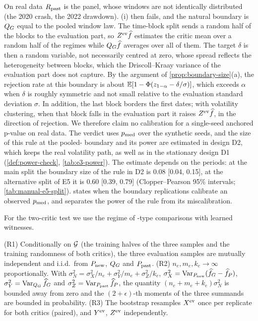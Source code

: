 \begin{remark}\label{rem:nonstat-past}
On real data $R_{\mathrm{past}}$ is the \TRAIN{} panel, whose windows are not identically distributed (the
2020 crash, the 2022 drawdown). (i) then fails, and the natural boundary is
$Q_{G}$ equal to the pooled \TRAIN{} window law. The time-block split sends a random half of the
\TRAIN{} blocks to the evaluation part, so $Z^{\mathrm{ev}}\widehat{f}$ estimates the critic mean over a random
half of the \TRAIN{} regimes while $Q_{G}\widehat{f}$ averages over all of them. The target $\delta$ is then
a random variable, not necessarily centred at zero, whose spread reflects the heterogeneity between
blocks, which the Driscoll--Kraay variance of the evaluation part does not capture. By the argument of
\cref{prop:boundary-size}(a), the rejection rate at this boundary is about
$\mathbb{E}[1-\Phi(z_{1-\alpha}-\delta/\sigma)]$, which exceeds $\alpha$ when $\delta$ is roughly symmetric
and not small relative to the evaluation standard deviation $\sigma$. In addition, the last
\TRAIN{} block borders the first \TEST{} dates; with volatility clustering, when that block falls
in the evaluation part it raises $Z^{\mathrm{ev}}\widehat{f}$, in the direction of rejection. We therefore claim
no calibration for a single-seed anchored p-value on real data. The verdict uses $p_{\mathrm{med}}$ over the
synthetic seeds, and the size of this rule at the pooled-\TRAIN{} boundary and its power are
estimated in design D2, which keeps the real \TRAIN{} volatility path, as well as in the
stationary design D1 (\cref{def:power-check}, \cref{tab:e3-power}). The estimate depends on the
periods: at the main split the boundary size of the rule in D2 is 0.08 [0.04, 0.15], at the
alternative split of E5 it is 0.60 [0.39, 0.79] (Clopper--Pearson 95\% intervals;
\cref{tab:manual-e5-split}).  states when the boundary replications
calibrate an observed $p_{\mathrm{med}}$, and separates the power of the rule from its miscalibration.
\end{remark}

For the two-critic test we use the regime of \citet{bounliphone2016test}-type comparisons with
learned witnesses.

\begin{assumption}\label{ass:rel}
(R1) Conditionally on $\mathcal{G}$ (the training halves of the three samples and the training
randomness of both critics), the three evaluation samples are mutually independent and i.i.d.\
from $P_{\mathrm{new}}$, $Q_{G}$ and $P_{\mathrm{past}}$. (R2) $n_e,m_e,k_e\to\infty$ proportionally. With
$\sigma_N^2=\sigma_X^2/n_e+\sigma_Y^2/m_e+\sigma_Z^2/k_e$, $\sigma_X^2=\operatorname{Var}_{P_{\mathrm{new}}}(\widehat{f}_G-\widehat{f}_P)$,
$\sigma_Y^2=\operatorname{Var}_{Q_{G}}\widehat{f}_G$ and $\sigma_Z^2=\operatorname{Var}_{P_{\mathrm{past}}}\widehat{f}_P$, the quantity
$(n_e+m_e+k_e)\sigma_N^2$ is bounded away from zero and the $(2+\epsilon)$-th moments of the
three summands are bounded in probability. (R3) The bootstrap resamples $X^{\mathrm{ev}}$ once per
replicate for both critics (paired), and $Y^{\mathrm{ev}}$, $Z^{\mathrm{ev}}$ independently.
\end{assumption}

